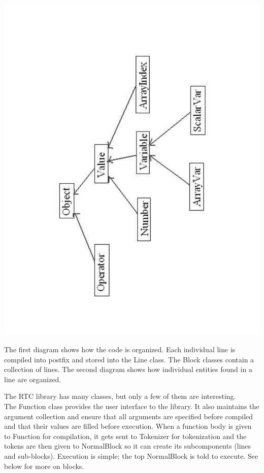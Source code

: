\documentclass{article}
\begin{document}
\begin{center}
\includegraphics[scale=0.36,angle=270]{diag2}
\end{center}

\noindent
The first diagram shows how the code is organized. Each individual line is
compiled into postfix and stored into the Line class. The Block classes
contain a collection of lines. The second diagram shows how individual
entities found in a line are organized.

\noindent
The RTC library has many classes, but only a few of them are interesting.\\

\noindent
The Function class provides the user interface to the library. It also 
maintains the argument collection and ensure that all arguments are specified 
before compiled and that their values are filled before execution. When a 
function body is given to Function for compilation, it gets sent to 
Tokenizer for tokenization and the tokens are then given to NormalBlock so
it can create its subcomponents (lines and sub-blocks). Execution is simple;
the top NormalBlock is told to execute. See below for more on blocks.\\
\end{document}
